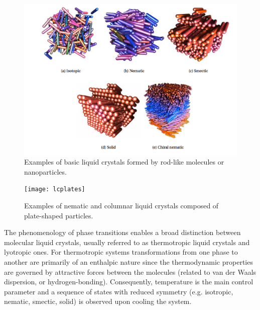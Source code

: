 \documentclass[amssymb]{revtex4}
\begin{document}
\begin{figure}
\begin{center}
\includegraphics[width= 0.8 \columnwidth]{lcrods}
\caption{ \label{introfig1} Examples of basic liquid crystals formed by rod-like molecules or nanoparticles.}
\end{center}
\end{figure}

 
\begin{figure}
\begin{center}
\texttt{[image: lcplates]}
\caption{ \label{introfig2} Examples of nematic and columnar liquid crystals composed of plate-shaped particles.}
\end{center}
\end{figure}

The phenomenology of phase transitions enables a broad distinction between molecular liquid crystals, usually referred to as thermotropic liquid crystals and lyotropic ones. For thermotropic systems transformations from one phase to another are primarily of an enthalpic nature since the thermodynamic properties are governed by attractive forces between the molecules (related to van der Waals dispersion, or hydrogen-bonding). Consequently, temperature is the main control parameter and a sequence of states with reduced symmetry (e.g. isotropic, nematic, smectic, solid) is observed upon cooling the system. 
\end{document}
